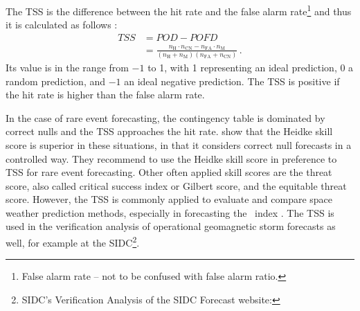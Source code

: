 The TSS is the difference between the hit rate and the false alarm rate\footnote{False alarm rate -- not to be confused with false alarm ratio.} and thus it is calculated as follows \citep[Eq.~15]{Hanssen1965}:
\begin{align}
	\mathit{TSS} &= \mathit{POD} - \mathit{POFD}\\
		&= \frac{n_\text{H} \cdot n_\text{CN} - n_\text{FA} \cdot n_\text{M}}{\left(n_\text{H}+n_\text{M}\right) (n_\text{FA}+n_\text{CN})}	\,.	\nonumber	\label{eq:true_skill_score}
\end{align}
Its value is in the range from $-1$ to 1, with 1 representing an ideal prediction, 0 a random prediction, and $-1$ an ideal negative prediction. The TSS is positive if the hit rate is higher than the false alarm rate.

In the case of rare event forecasting, the contingency table is dominated by correct nulls and the TSS approaches the hit rate. \citet{Doswell1990} show that the Heidke skill score is superior in these situations, in that it considers correct null forecasts in a controlled way. They recommend to use the Heidke skill score in preference to TSS for rare event forecasting. Other often applied skill scores are the threat score, also called critical success index or Gilbert score, and the equitable threat score. However, the TSS is commonly applied to evaluate and compare space weather prediction methods, especially in forecasting the \Kp~index \citep{Detman1999,Wing2005,Savani2017}. The TSS is used in the verification analysis of operational geomagnetic storm forecasts as well, for example at the SIDC\footnote{SIDC's Verification Analysis of the SIDC Forecast website: }.




